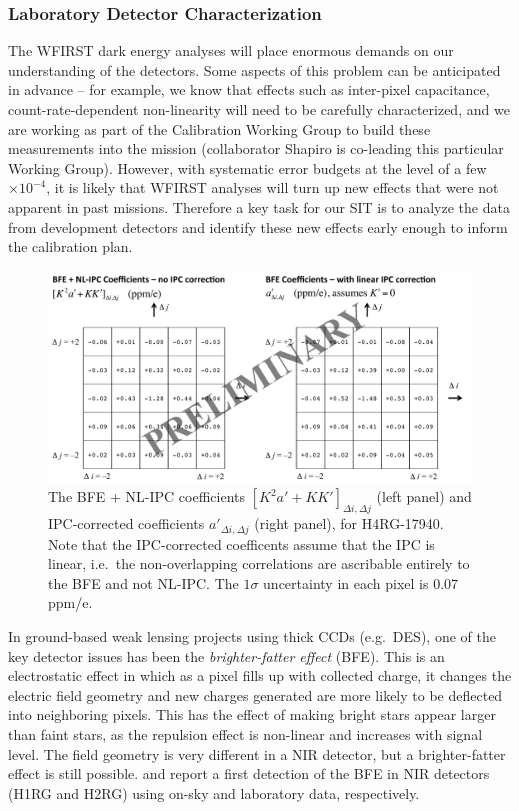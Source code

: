 \subsubsection{Laboratory Detector Characterization}

The WFIRST dark energy analyses will place enormous demands on our understanding
of the detectors. Some aspects of this problem can be anticipated in advance --
for example, we know that effects such as inter-pixel capacitance,
count-rate-dependent non-linearity  will need to be carefully
characterized, and we are working as part of the Calibration Working Group to
build these measurements into the mission (collaborator Shapiro is co-leading this particular Working Group). However, with systematic error
budgets at the level of a few$\times 10^{-4}$, it is likely that WFIRST analyses
will turn up new effects that were not apparent in past missions. Therefore a
key task for our SIT is to analyze the data from development detectors and
identify these new effects early enough to inform the calibration plan.

\begin{figure}[!t]
  \includegraphics[width=6.2in]{Plots/kernel-17940B.pdf}
\caption{\label{fig:kernel}The BFE + NL-IPC coefficients $[K^2a'+KK']_{\Delta
i,\Delta j}$ (left panel) and IPC-corrected coefficients $a'_{\Delta i,\Delta
j}$ (right panel), for H4RG-17940. Note that the IPC-corrected coefficents
assume that the IPC is linear, i.e.\ the non-overlapping correlations are
ascribable entirely to the BFE and not NL-IPC. The $1\sigma$ uncertainty in each
pixel is 0.07 ppm/e.}
\end{figure}

In ground-based weak lensing projects using thick CCDs (e.g.\ DES), one of the
key detector issues has been the {\em brighter-fatter effect} (BFE). This is an
electrostatic effect in which as a pixel fills up with collected charge, it
changes the electric field geometry and new charges generated are more likely to
be deflected into neighboring pixels. This has the effect of making bright stars
appear larger than faint stars, as the repulsion effect is non-linear and
increases with signal level. The field geometry is very different in a NIR
detector, but a brighter-fatter effect is still possible. \cite{2017JInst..12C4009P} and \cite{2017arXiv171206642P} report a first detection of the BFE in NIR detectors (H1RG and H2RG) using on-sky and laboratory data, respectively.


